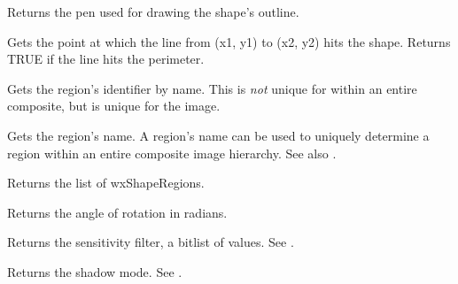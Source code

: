 

Returns the pen used for drawing the shape's outline.



Gets the point at which the line from (x1, y1) to (x2, y2) hits the shape. Returns TRUE if the
line hits the perimeter.

\label{getregionid}


Gets the region's identifier by name. This is {\it not} unique for within an entire composite, but
is unique for the image.

\label{getregionname}


Gets the region's name. A region's name can be used to uniquely determine a region within
an entire composite image hierarchy. See also .

\label{getregions}


Returns the list of wxShapeRegions.



Returns the angle of rotation in radians.



Returns the sensitivity filter, a bitlist of values. See .



Returns the shadow mode. See .

